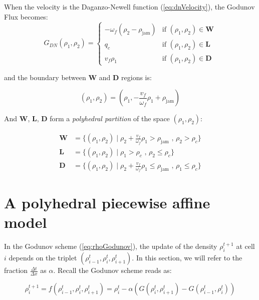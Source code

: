 \documentclass[11pt]{article}
\numberwithin{equation}{section}
\numberwithin{figure}{section}
\numberwithin{table}{section}
\begin{document}
\noindent When the velocity is the Daganzo-Newell function (\ref{eq:dnVelocity}), the Godunov Flux becomes:
\begin{equation} \label{eq:rhoGodunovFlux3}
G_{DN}(\rho_{1},\rho_{2}) = \begin{cases}
-\omega_{f} \left( \rho_{2} - \rho_{\text{jam}} \right) & \text{if } (\rho_{1},\rho_{2}) \in \textbf{W}\\
q_{c} & \text{if } (\rho_{1},\rho_{2}) \in \textbf{L}\\
v_{f} \rho_{1} & \text{if } (\rho_{1},\rho_{2}) \in \textbf{D}
\end{cases}
\end{equation}

\noindent and the boundary between \textbf{W} and \textbf{D} regions is:

\begin{equation} \label{eq:boundary}
(\rho_{1},\rho_{2})=(\rho_{1},-\frac{v_{f}}{\omega_{f}}\rho_{1}+\rho_{\text{jam}})
\end{equation}

\noindent And \textbf{W}, \textbf{L}, \textbf{D} form a \textit{polyhedral partition} of the space $(\rho_{1},\rho_{2})$:

\begin{equation}
\begin{array}{ll}
\textbf{W} & = \{(\rho_{1},\rho_{2}) \mid \rho_{2} + \frac{v_{f}}{\omega_{f}}\rho_{1} > \rho_{\text{jam}} \text{ ,   } \rho_{2} > \rho_{c}\}\\
\textbf{L} & = \{(\rho_{1},\rho_{2}) \mid \rho_{1} > \rho_{c} \text{ ,   } \rho_{2} \leq \rho_{c}\}\\
\textbf{D} & = \{(\rho_{1},\rho_{2}) \mid \rho_{2} + \frac{v_{f}}{\omega_{f}}\rho_{1} \leq \rho_{\text{jam}} \text{ ,   } \rho_{1} \leq \rho_{c}\}\end{array}
\label{eq:regions2}
\end{equation}

\section{A polyhedral piecewise affine model}

In the Godunov scheme (\ref{eq:rhoGodunov}), the update of the density $\rho^{t+1}_{i}$ at cell $i$ depends on the triplet $(\rho^{t}_{i-1}, \rho^{t}_{i}, \rho^{t}_{i+1})$. In this section, we will refer to the fraction $\frac{\Delta t}{\Delta x}$ as $\alpha$. Recall the Godunov scheme reads as:

\begin{equation} \label{eq:rhoGodunov2}
\rho^{t+1}_{i} = f(\rho^{t}_{i-1},\rho^{t}_{i},\rho^{t}_{i+1}) = \rho^{t}_{i} - \alpha\left(G(\rho^{t}_{i},\rho^{t}_{i+1})-G(\rho^{t}_{i-1},\rho^{t}_{i})\right)
\end{equation}
\end{document}
